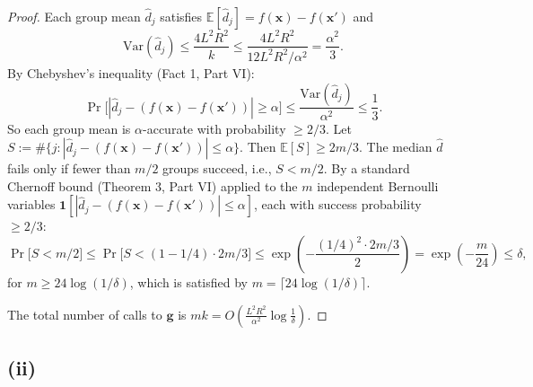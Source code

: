 \begin{proof}
Each group mean $\hat{d}_j$ satisfies $\mathbb{E}[\hat{d}_j] = f(\mathbf{x}) - f(\mathbf{x}')$ and
\[
\mathrm{Var}(\hat{d}_j) \leq \frac{4L^2R^2}{k} \leq \frac{4L^2R^2}{12L^2R^2/\alpha^2} = \frac{\alpha^2}{3}.
\]
By Chebyshev's inequality (Fact 1, Part VI):
\[
\Pr\bigl[|\hat{d}_j - (f(\mathbf{x}) - f(\mathbf{x}'))| \geq \alpha\bigr] \leq \frac{\mathrm{Var}(\hat{d}_j)}{\alpha^2} \leq \frac{1}{3}.
\]
So each group mean is $\alpha$-accurate with probability $\geq 2/3$. Let $S := \#\{j : |\hat{d}_j - (f(\mathbf{x})-f(\mathbf{x}'))| \leq \alpha\}$. Then $\mathbb{E}[S] \geq 2m/3$. The median $\hat{d}$ fails only if fewer than $m/2$ groups succeed, i.e., $S < m/2$. By a standard Chernoff bound (Theorem 3, Part VI) applied to the $m$ independent Bernoulli variables $\mathbf{1}[|\hat{d}_j - (f(\mathbf{x})-f(\mathbf{x}'))| \leq \alpha]$, each with success probability $\geq 2/3$:
\[
\Pr\bigl[S < m/2\bigr] \leq \Pr\bigl[S < (1 - 1/4) \cdot 2m/3\bigr] \leq \exp\!\left(-\frac{(1/4)^2 \cdot 2m/3}{2}\right) = \exp\!\left(-\frac{m}{24}\right) \leq \delta,
\]
for $m \geq 24\log(1/\delta)$, which is satisfied by $m = \lceil 24\log(1/\delta) \rceil$.

The total number of calls to $\mathbf{g}$ is $mk = O\!\left(\frac{L^2R^2}{\alpha^2}\log\frac{1}{\delta}\right)$.
\end{proof}

\subsection*{(ii)}

